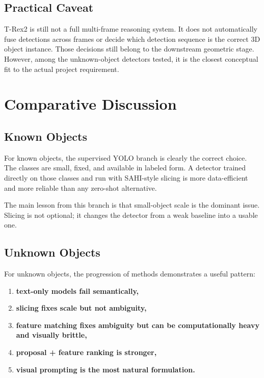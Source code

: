 \documentclass[11pt,a4paper]{article}
\begin{document}
\subsection{Practical Caveat}

T-Rex2 is still not a full multi-frame reasoning system. It does not automatically fuse detections across frames or decide which detection sequence is the correct 3D object instance. Those decisions still belong to the downstream geometric stage. However, among the unknown-object detectors tested, it is the closest conceptual fit to the actual project requirement.

\section{Comparative Discussion}

\subsection{Known Objects}

For known objects, the supervised YOLO branch is clearly the correct choice. The classes are small, fixed, and available in labeled form. A detector trained directly on those classes and run with SAHI-style slicing is more data-efficient and more reliable than any zero-shot alternative.

The main lesson from this branch is that small-object scale is the dominant issue. Slicing is not optional; it changes the detector from a weak baseline into a usable one.

\subsection{Unknown Objects}

For unknown objects, the progression of methods demonstrates a useful pattern:
\begin{enumerate}[leftmargin=1.5em]
  \item \textbf{text-only models fail semantically,}
  \item \textbf{slicing fixes scale but not ambiguity,}
  \item \textbf{feature matching fixes ambiguity but can be computationally heavy and visually brittle,}
  \item \textbf{proposal + feature ranking is stronger,}
  \item \textbf{visual prompting is the most natural formulation.}
\end{enumerate}
\end{document}
